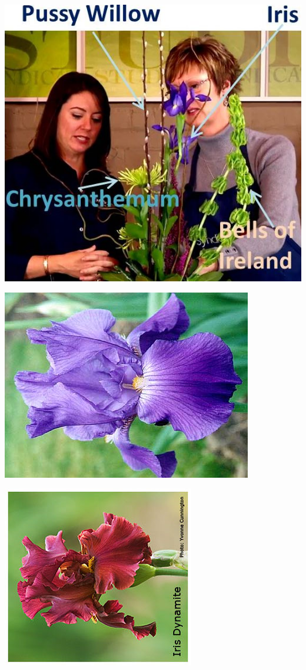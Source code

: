 \documentclass{article}
\begin{document}
\begin{center}
\includegraphics[height=0.925\paperheight]{../Iris-PussyWillow-Mum_BellsIreland.jpg}
\end{center}
\newpage

\begin{center}
\includegraphics[height=0.925\paperheight]{../Iris_Chivalry.jpg}
\end{center}
\newpage

\begin{center}
\includegraphics[height=0.925\paperheight]{../Iris_Dynamite.jpg}
\end{center}
\newpage
\end{document}
